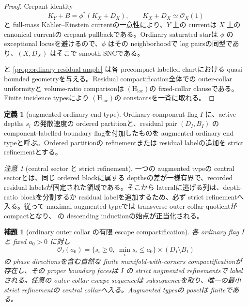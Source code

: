 \documentclass[11pt,a4paper]{ltjsarticle}
\newcommand{\Hloc}{\ensuremath{(\mathrm H_{\mathrm{loc}})}}
\theoremstyle{plain}
\newtheorem{lemma}[theorem]{補題}\newtheorem{corollary}[theorem]{系}
\theoremstyle{definition}
\newtheorem{definition}[theorem]{定義}\newtheorem{hypothesis}[theorem]{仮定}
\theoremstyle{remark}
\newtheorem{remark}[theorem]{注意}\newtheorem{warning}[theorem]{警告}
\begin{document}
\begin{proof}
Crepant identity
\[
 K_Y+B=\phi^*(K_X+D_X),
 \qquad K_X+D_X\simeq\mathcal O_X(1)
\]
と full-mass K\"ahler--Einstein currentの一意性により、$Y$ 上の currentは $X$ 上の canonical currentの crepant pullbackである。Ordinary saturated starは $\phi$ の exceptional locusを避けるので、$\phi$ はその neighborhoodで log pairsの同型であり、$(X,D_X)$ はそこで smooth SNCである。

 と \cref{prop:ordinary-residual-ample} は各 precompact labelled chartにおける quasi-bounded geometryを与える。Residual compactification全体での outer-collar uniformityと volume-ratio comparisonは \Hloc の fixed-collar clauseである。Finite incidence typesにより \Hloc の constantsを一斉に取れる。
\end{proof}

\begin{definition}[augmented ordinary end type]\label{def:augmented-ordinary}
Ordinary component flag $I$ に、active depths $s_i$ の発散速度の ordered partitionと、residual pair $(D_I,B_I)$ の component-labelled boundary flagを付加したものを augmented ordinary end typeと呼ぶ。Ordered partitionの refinementまたは residual labelの追加を strict refinementとする。
\end{definition}

\begin{remark}[central sector と strict refinement]
一つの augmented typeの central sectorとは、同じ ordered blockに属する depthsの差が一様有界で、recorded residual labelsが固定された領域である。そこから lateralに逃げる列は、depth-ratio blockを分割するか residual labelを追加するため、必ず strict refinementへ入る。従って maximal augmented typeでは transverse outer-collar quotientが compactとなり、 の descending inductionの始点が正当化される。
\end{remark}

\begin{lemma}[ordinary outer collar の有限 escape compactification]\label{lem:ordinary-escape-compactification}
各 ordinary flag $I$ と fixed $a_0>0$ に対し
\[
 \mathcal O_I(a_0)
 =\{s_i\ge0,\ \min_i s_i\le a_0\}
 \times(D_I\setminus B_I)
\]
の phase directionsを含む自然な finite manifold-with-corners compactificationが存在し、その proper boundary facesは $I$ の strict augmented refinementsで labelされる。任意の outer-collar escape sequenceは subsequenceを取り、唯一の最小 strict refinementの central collarへ入る。Augmented typesの posetは finiteである。
\end{lemma}
\end{document}
